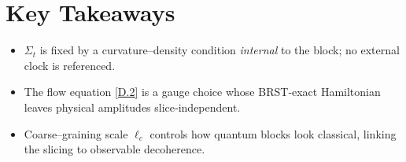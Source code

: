 \documentclass[12pt]{article}
\begin{document}
\section*{Key Takeaways}
\begin{itemize}
  \item $\Sigma_t$ is fixed by a curvature--density condition \emph{internal} to the block; no external clock is referenced.
  \item The flow equation \eqref{D.2} is a gauge choice whose BRST‐exact Hamiltonian leaves physical amplitudes slice‐independent.
  \item Coarse--graining scale $\ell_c$ controls how quantum blocks look classical, linking the slicing to observable decoherence.
\end{itemize}
\end{document}
